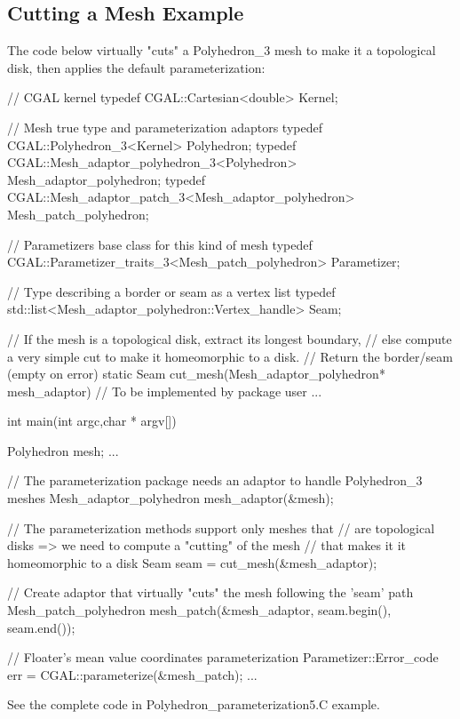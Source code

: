 \subsection{Cutting a Mesh Example}

The code below virtually "cuts" a Polyhedron\_3 mesh to make it a topological disk,
then applies the default parameterization:

\begin{ccExampleCode}

// CGAL kernel
typedef CGAL::Cartesian<double>                             Kernel;

// Mesh true type and parameterization adaptors
typedef CGAL::Polyhedron_3<Kernel>                          Polyhedron;
typedef CGAL::Mesh_adaptor_polyhedron_3<Polyhedron>         Mesh_adaptor_polyhedron;
typedef CGAL::Mesh_adaptor_patch_3<Mesh_adaptor_polyhedron> Mesh_patch_polyhedron;

// Parametizers base class for this kind of mesh
typedef CGAL::Parametizer_traits_3<Mesh_patch_polyhedron>   Parametizer;

// Type describing a border or seam as a vertex list
typedef std::list<Mesh_adaptor_polyhedron::Vertex_handle>   Seam;

// If the mesh is a topological disk, extract its longest boundary,
// else compute a very simple cut to make it homeomorphic to a disk.
// Return the border/seam (empty on error)
static Seam cut_mesh(Mesh_adaptor_polyhedron* mesh_adaptor)
{
    // To be implemented by package user
    ...
}

int main(int argc,char * argv[])
{
    Polyhedron mesh;
    ...

    // The parameterization package needs an adaptor to handle Polyhedron_3 meshes
    Mesh_adaptor_polyhedron mesh_adaptor(&mesh);

    // The parameterization methods support only meshes that
    // are topological disks => we need to compute a "cutting" of the mesh
    // that makes it it homeomorphic to a disk
    Seam seam = cut_mesh(&mesh_adaptor);

    // Create adaptor that virtually "cuts" the mesh following the 'seam' path
    Mesh_patch_polyhedron   mesh_patch(&mesh_adaptor,
                                       seam.begin(),
                                       seam.end());

    // Floater's mean value coordinates parameterization
    Parametizer::Error_code err = CGAL::parameterize(&mesh_patch);
    ...
}

\end{ccExampleCode}

See the complete code in Polyhedron\_parameterization5.C example.


